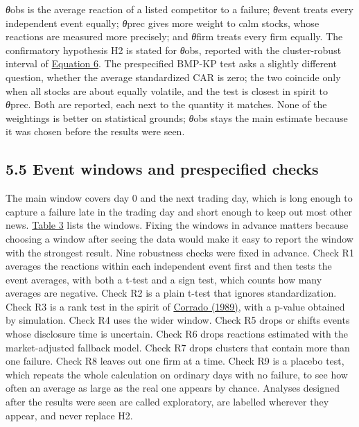 \documentclass[12pt,a4paper]{article}
\begin{document}
\emph{θ}obs is the average reaction of a listed competitor to a failure; \emph{θ}event treats every independent event equally; \emph{θ}prec gives more weight to calm stocks, whose reactions are measured more precisely; and \emph{θ}firm treats every firm equally. The confirmatory hypothesis H2 is stated for \emph{θ}obs, reported with the cluster-robust interval of \hyperlink{eq-6}{Equation 6}. The prespecified BMP-KP test asks a slightly different question, whether the average standardized CAR is zero; the two coincide only when all stocks are about equally volatile, and the test is closest in spirit to \emph{θ}prec. Both are reported, each next to the quantity it matches. None of the weightings is better on statistical grounds; \emph{θ}obs stays the main estimate because it was chosen before the results were seen.

\subsection*{5.5 Event windows and prespecified checks}
The main window covers day 0 and the next trading day, which is long enough to capture a failure late in the trading day and short enough to keep out most other news. \hyperlink{tab-win}{Table 3} lists the windows. Fixing the windows in advance matters because choosing a window after seeing the data would make it easy to report the window with the strongest result. Nine robustness checks were fixed in advance. Check R1 averages the reactions within each independent event first and then tests the event averages, with both a t-test and a sign test, which counts how many averages are negative. Check R2 is a plain t-test that ignores standardization. Check R3 is a rank test in the spirit of \hyperlink{ref-corrado1989}{Corrado (1989)}, with a p-value obtained by simulation. Check R4 uses the wider window. Check R5 drops or shifts events whose disclosure time is uncertain. Check R6 drops reactions estimated with the market-adjusted fallback model. Check R7 drops clusters that contain more than one failure. Check R8 leaves out one firm at a time. Check R9 is a placebo test, which repeats the whole calculation on ordinary days with no failure, to see how often an average as large as the real one appears by chance. Analyses designed after the results were seen are called exploratory, are labelled wherever they appear, and never replace H2.
\end{document}
